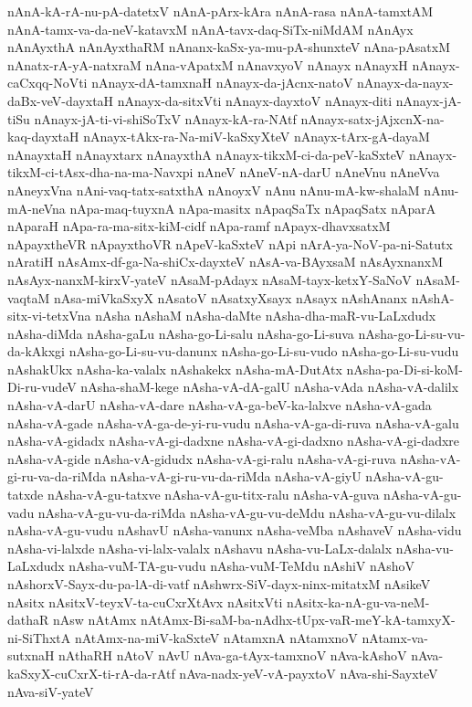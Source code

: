 {nAnA-kA-rA-nu-pA-datetxV
nAnA-pArx-kAra
nAnA-rasa
nAnA-tamxtAM
nAnA-tamx-va-da-neV-katavxM
nAnA-tavx-daq-SiTx-niMdAM
nAnAyx
nAnAyxthA
nAnAyxthaRM
nAnanx-kaSx-ya-mu-pA-shunxteV
nAna-pAsatxM
nAnatx-rA-yA-natxraM
nAna-vApatxM
nAnavxyoV
nAnayx
nAnayxH
nAnayx-caCxqq-NoVti
nAnayx-dA-tamxnaH
nAnayx-da-jAcnx-natoV
nAnayx-da-nayx-daBx-veV-dayxtaH
nAnayx-da-sitxVti
nAnayx-dayxtoV
nAnayx-diti
nAnayx-jA-tiSu
nAnayx-jA-ti-vi-shiSoTxV
nAnayx-kA-ra-NAtf
nAnayx-satx-jAjxcnX-na-kaq-dayxtaH
nAnayx-tAkx-ra-Na-miV-kaSxyXteV
nAnayx-tArx-gA-dayaM
nAnayxtaH
nAnayxtarx
nAnayxthA
nAnayx-tikxM-ci-da-peV-kaSxteV
nAnayx-tikxM-ci-tAsx-dha-na-ma-Navxpi
nAneV
nAneV-nA-darU
nAneVnu
nAneVva
nAneyxVna
nAni-vaq-tatx-satxthA
nAnoyxV
nAnu
nAnu-mA-kw-shalaM
nAnu-mA-neVna
nApa-maq-tuyxnA
nApa-masitx
nApaqSaTx
nApaqSatx
nAparA
nAparaH
nApa-ra-ma-sitx-kiM-cidf
nApa-ramf
nApayx-dhavxsatxM
nApayxtheVR
nApayxthoVR
nApeV-kaSxteV
nApi
nArA-ya-NoV-pa-ni-Satutx
nAratiH
nAsAmx-df-ga-Na-shiCx-dayxteV
nAsA-va-BAyxsaM
nAsAyxnanxM
nAsAyx-nanxM-kirxV-yateV
nAsaM-pAdayx
nAsaM-tayx-ketxY-SaNoV
nAsaM-vaqtaM
nAsa-miVkaSxyX
nAsatoV
nAsatxyXsayx
nAsayx
nAshAnanx
nAshA-sitx-vi-tetxVna
nAsha
nAshaM
nAsha-daMte
nAsha-dha-maR-vu-LaLxdudx
nAsha-diMda
nAsha-gaLu
nAsha-go-Li-salu
nAsha-go-Li-suva
nAsha-go-Li-su-vu-da-kAkxgi
nAsha-go-Li-su-vu-danunx
nAsha-go-Li-su-vudo
nAsha-go-Li-su-vudu
nAshakUkx
nAsha-ka-valalx
nAshakekx
nAsha-mA-DutAtx
nAsha-pa-Di-si-koM-Di-ru-vudeV
nAsha-shaM-kege
nAsha-vA-dA-galU
nAsha-vAda
nAsha-vA-dalilx
nAsha-vA-darU
nAsha-vA-dare
nAsha-vA-ga-beV-ka-lalxve
nAsha-vA-gada
nAsha-vA-gade
nAsha-vA-ga-de-yi-ru-vudu
nAsha-vA-ga-di-ruva
nAsha-vA-galu
nAsha-vA-gidadx
nAsha-vA-gi-dadxne
nAsha-vA-gi-dadxno
nAsha-vA-gi-dadxre
nAsha-vA-gide
nAsha-vA-gidudx
nAsha-vA-gi-ralu
nAsha-vA-gi-ruva
nAsha-vA-gi-ru-va-da-riMda
nAsha-vA-gi-ru-vu-da-riMda
nAsha-vA-giyU
nAsha-vA-gu-tatxde
nAsha-vA-gu-tatxve
nAsha-vA-gu-titx-ralu
nAsha-vA-guva
nAsha-vA-gu-vadu
nAsha-vA-gu-vu-da-riMda
nAsha-vA-gu-vu-deMdu
nAsha-vA-gu-vu-dilalx
nAsha-vA-gu-vudu
nAshavU
nAsha-vanunx
nAsha-veMba
nAshaveV
nAsha-vidu
nAsha-vi-lalxde
nAsha-vi-lalx-valalx
nAshavu
nAsha-vu-LaLx-dalalx
nAsha-vu-LaLxdudx
nAsha-vuM-TA-gu-vudu
nAsha-vuM-TeMdu
nAshiV
nAshoV
nAshorxV-Sayx-du-pa-lA-di-vatf
nAshwrx-SiV-dayx-ninx-mitatxM
nAsikeV
nAsitx
nAsitxV-teyxV-ta-cuCxrXtAvx
nAsitxVti
nAsitx-ka-nA-gu-va-neM-dathaR
nAsw
nAtAmx
nAtAmx-Bi-saM-ba-nAdhx-tUpx-vaR-meY-kA-tamxyX-ni-SiThxtA
nAtAmx-na-miV-kaSxteV
nAtamxnA
nAtamxnoV
nAtamx-va-sutxnaH
nAthaRH
nAtoV
nAvU
nAva-ga-tAyx-tamxnoV
nAva-kAshoV
nAva-kaSxyX-cuCxrX-ti-rA-da-rAtf
nAva-nadx-yeV-vA-payxtoV
nAva-shi-SayxteV
nAva-siV-yateV
}
